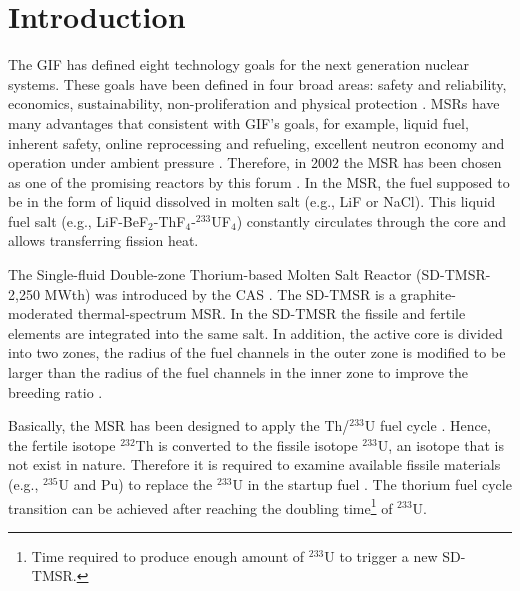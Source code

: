 \section{Introduction}
The \gls{GIF} has defined eight technology goals for the next generation nuclear systems. These goals have been defined in four broad areas: safety and reliability, economics, sustainability, non-proliferation and physical protection \cite{doe2002technology}. \glspl{MSR} have many advantages that consistent with \gls{GIF}'s goals, for example, liquid fuel, inherent safety, online reprocessing and refueling, excellent neutron economy and operation under ambient pressure \cite{siemer2015molten,rosenthal1970molten}. Therefore, in 2002 the \gls{MSR} has been chosen as one of the promising reactors by this forum \cite{doe2002technology,pioro2016handbook}.
In the \gls{MSR}, the fuel supposed to be in the form of liquid dissolved in molten salt (e.g., LiF or NaCl). This liquid fuel salt (e.g., LiF-BeF$_2$-ThF$_4$-$^{233}$UF$_4$) constantly circulates through the core and allows transferring fission heat. 
 
The Single-fluid Double-zone Thorium-based Molten Salt Reactor (SD-TMSR-2,250 MWth) was introduced by the \gls{CAS} \cite{li_optimization_2018}. The SD-TMSR is a graphite-moderated thermal-spectrum MSR. In the SD-TMSR the fissile and fertile elements are integrated into the same salt. In addition, the active core is divided into two zones, the radius of the fuel channels in the outer zone is modified to be larger than the radius of the fuel channels in the inner zone to improve the breeding ratio \cite{nuttin2005potential,li_optimization_2018}.

Basically, the \gls{MSR} has been designed to apply the Th/$^{233}$U fuel cycle \cite{rykhlevskii2019modeling,nuttin2005potential,merle2004scenarios,rosenthal1970molten}. Hence, the fertile isotope $^{232}$Th is converted to the fissile isotope $^{233}$U, an isotope that is not exist in nature. Therefore it is required to examine available fissile materials (e.g., $^{235}$U and Pu) to replace the $^{233}$U in the startup fuel \cite{betzler2016modeling,zou2018transition}. The thorium fuel cycle transition can be achieved after reaching the doubling time\footnote{Time required to produce enough amount of $^{233}$U to trigger a new SD-TMSR.} of $^{233}$U.

